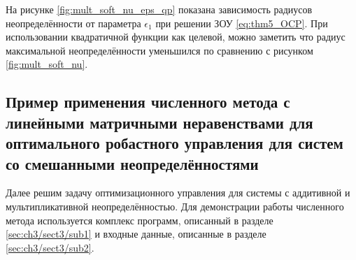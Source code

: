 На рисунке \ref{fig:mult_soft_nu_eps_qp} показана зависимость радиусов неопределённости от параметра $\epsilon_1$ при решении ЗОУ \eqref{eq:thm5_OCP}. При использовании квадратичной функции как целевой, можно заметить что радиус максимальной неопределённости уменьшился по сравнению с рисунком \ref{fig:mult_soft_nu}.

\subsection{Пример применения численного метода с линейными матричными неравенствами для оптимального робастного управления для систем со смешанными неопределённостями}\label{sec:ch4/sect3/sub2}
Далее решим задачу оптимизационного управления для системы с аддитивной и мультипликативной неопределённостью. Для демонстрации работы численного метода используется комплекс программ, описанный в разделе \ref{sec:ch3/sect3/sub1} и входные данные, описанные в разделе \ref{sec:ch3/sect3/sub2}.

